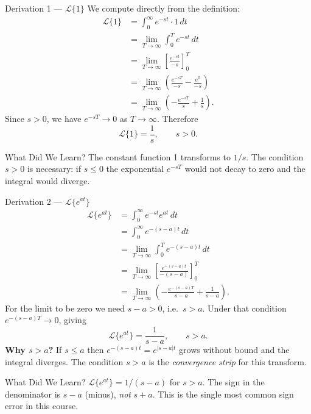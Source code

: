 \documentclass[12pt,a4paper]{article}
\begin{document}
\begin{infobox}{Derivation 1 --- $\mathcal{L}\{1\}$}
We compute directly from the definition:
\begin{align*}
  \mathcal{L}\{1\}
  &= \int_0^\infty e^{-st} \cdot 1\, dt \\
  &= \lim_{T \to \infty} \int_0^T e^{-st}\, dt \\
  &= \lim_{T \to \infty} \left[\frac{e^{-st}}{-s}\right]_0^T \\
  &= \lim_{T \to \infty} \left(\frac{e^{-sT}}{-s} - \frac{e^{0}}{-s}\right) \\
  &= \lim_{T \to \infty} \left(-\frac{e^{-sT}}{s} + \frac{1}{s}\right).
\end{align*}
Since $s > 0$, we have $e^{-sT} \to 0$ as $T \to \infty$. Therefore
\[
  \mathcal{L}\{1\} = \frac{1}{s}, \qquad s > 0.
\]
\end{infobox}

\begin{learnbox}{What Did We Learn?}
The constant function 1 transforms to $1/s$. The condition $s > 0$ is
necessary: if $s \leq 0$ the exponential $e^{-sT}$ would not decay to zero
and the integral would diverge.
\end{learnbox}

\begin{infobox}{Derivation 2 --- $\mathcal{L}\{e^{at}\}$}
\begin{align*}
  \mathcal{L}\{e^{at}\}
  &= \int_0^\infty e^{-st} e^{at}\, dt \\
  &= \int_0^\infty e^{-(s-a)t}\, dt \\
  &= \lim_{T \to \infty} \int_0^T e^{-(s-a)t}\, dt \\
  &= \lim_{T \to \infty} \left[\frac{e^{-(s-a)t}}{-(s-a)}\right]_0^T \\
  &= \lim_{T \to \infty} \left(-\frac{e^{-(s-a)T}}{s-a} + \frac{1}{s-a}\right).
\end{align*}
For the limit to be zero we need $s - a > 0$, i.e.\ $s > a$. Under that
condition $e^{-(s-a)T} \to 0$, giving
\[
  \mathcal{L}\{e^{at}\} = \frac{1}{s - a}, \qquad s > a.
\]
\textbf{Why $s > a$?} If $s \leq a$ then $e^{-(s-a)t} = e^{|s-a|t}$ grows
without bound and the integral diverges. The condition $s > a$ is the
\emph{convergence strip} for this transform.
\end{infobox}

\begin{learnbox}{What Did We Learn?}
$\mathcal{L}\{e^{at}\} = 1/(s-a)$ for $s > a$. The sign in the denominator
is $s - a$ (minus), \emph{not} $s + a$. This is the single most common sign
error in this course.
\end{learnbox}
\end{document}
